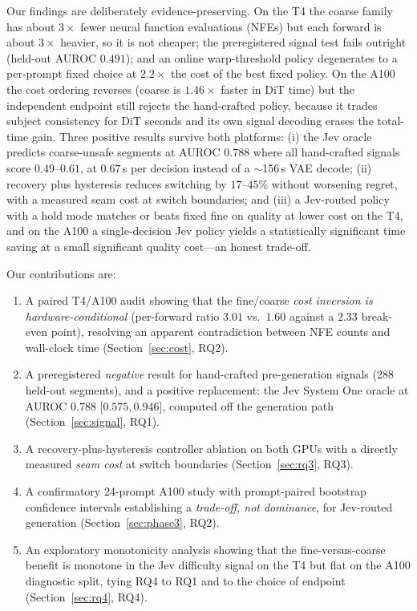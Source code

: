 \documentclass[journal]{IEEEtran}
\begin{document}
Our findings are deliberately evidence-preserving. On the T4 the coarse family has about $3\times$ fewer neural function evaluations (NFEs) but each forward is about $3\times$ heavier, so it is not cheaper; the preregistered signal test fails outright (held-out AUROC $0.491$); and an online warp-threshold policy degenerates to a per-prompt fixed choice at $2.2\times$ the cost of the best fixed policy. On the A100 the cost ordering reverses (coarse is $1.46\times$ faster in DiT time) but the independent endpoint still rejects the hand-crafted policy, because it trades subject consistency for DiT seconds and its own signal decoding erases the total-time gain. Three positive results survive both platforms: (i) the Jev oracle predicts coarse-unsafe segments at AUROC $0.788$ where all hand-crafted signals score $0.49$--$0.61$, at $0.67$\,s per decision instead of a $\sim$156\,s VAE decode; (ii) recovery plus hysteresis reduces switching by $17$--$45\%$ without worsening regret, with a measured seam cost at switch boundaries; and (iii) a Jev-routed policy with a hold mode matches or beats fixed fine on quality at lower cost on the T4, and on the A100 a single-decision Jev policy yields a statistically significant time saving at a small significant quality cost---an honest trade-off.

Our contributions are:
\begin{enumerate}
\item A paired T4/A100 audit showing that the fine/coarse \emph{cost inversion is hardware-conditional} (per-forward ratio $3.01$ vs.\ $1.60$ against a $2.33$ break-even point), resolving an apparent contradiction between NFE counts and wall-clock time (Section~\ref{sec:cost}, RQ2).
\item A preregistered \emph{negative} result for hand-crafted pre-generation signals (288 held-out segments), and a positive replacement: the Jev System One oracle at AUROC $0.788$ [$0.575,0.946$], computed off the generation path (Section~\ref{sec:signal}, RQ1).
\item A recovery-plus-hysteresis controller ablation on both GPUs with a directly measured \emph{seam cost} at switch boundaries (Section~\ref{sec:rq3}, RQ3).
\item A confirmatory 24-prompt A100 study with prompt-paired bootstrap confidence intervals establishing a \emph{trade-off, not dominance}, for Jev-routed generation (Section~\ref{sec:phase3}, RQ2).
\item An exploratory monotonicity analysis showing that the fine-versus-coarse benefit is monotone in the Jev difficulty signal on the T4 but flat on the A100 diagnostic split, tying RQ4 to RQ1 and to the choice of endpoint (Section~\ref{sec:rq4}, RQ4).
\end{enumerate}
\end{document}
